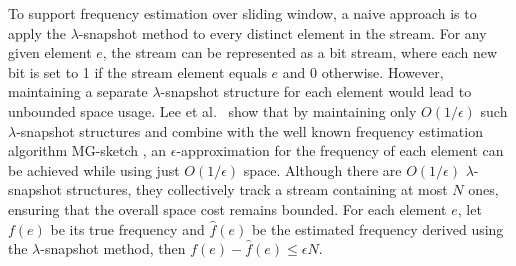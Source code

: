 To support frequency estimation over sliding window, a naive approach is to apply the $\lambda$-snapshot method to every distinct element in the stream. For any given element $e$, the stream can be represented as a bit stream, where each new bit is set to 1 if the stream element equals $e$ and 0 otherwise. However, maintaining a separate $\lambda$-snapshot structure for each element would lead to unbounded space usage. Lee et al.\ \cite{LeeT06} show that by maintaining only $O(1/\epsilon)$ such $\lambda$-snapshot structures and combine with the well known frequency estimation algorithm MG-sketch \cite{MisraG82}, an $\epsilon$-approximation for the frequency of each element can be achieved while using just $O(1/\epsilon)$ space. Although there are $O(1/\epsilon)$ $\lambda$-snapshot structures, they collectively track a stream containing at most $N$ ones, ensuring that the overall space cost remains bounded. For each element $e$, let $f(e)$ be its true frequency and $\hat{f}(e)$ be the estimated frequency derived using the $\lambda$-snapshot method, then
\(
f(e)-\hat{f}(e) \leq \epsilon N.
\)







